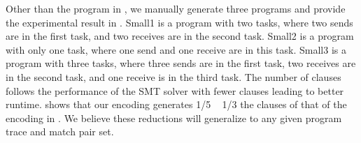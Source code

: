 Other than the program in , we manually generate three programs and provide the experimental result in . Small1 is a program with two tasks, where two sends are in the first task, and two receives are in the second task. Small2 is a program with only one task, where one send and one receive are in this task. Small3 is a program with three tasks, where three sends are in the first task, two receives are in the second task, and one receive is in the third task. The number of clauses follows the performance of the SMT solver with fewer clauses leading to better runtime.  shows that our encoding generates  1/5 ~ 1/3  the clauses of that of the encoding in \cite{elwakil:padtad10}. We believe these reductions will generalize to any given program trace and match pair set. 






